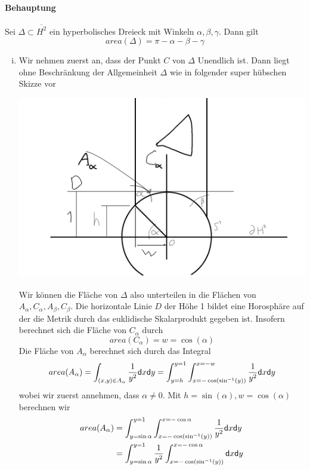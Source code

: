 \documentclass{book}
\renewcommand{\d}{\textsf{d}}
\begin{document}
\paragraph{Behauptung}
Sei $\Delta \subset \overline{H^2}$ ein hyperbolisches Dreieck mit Winkeln $\alpha, \beta, \gamma$. Dann gilt
\[ area(\Delta) = \pi - \alpha - \beta - \gamma \]
\begin{Beweis}{}
	\begin{enumerate}[(i)]
		\item Wir nehmen zuerst an, dass der Punkt $C$ von $\Delta$ Unendlich ist. Dann liegt ohne Beschränkung der Allgemeinheit $\Delta$ wie in folgender super hübschen Skizze vor
		\begin{center}
			\includegraphics[scale = 0.3]{Skizze1.png}	
		\end{center}
		Wir können die Fläche von $\Delta$ also unterteilen in die Flächen von $A_{\alpha}, C_{\alpha}, A_{\beta}, C_{\beta}$. Die horizontale Linie $D$ der Höhe 1 bildet eine Horosphäre auf der die Metrik durch das euklidische Skalarprodukt gegeben ist. Insofern berechnet sich die Fläche von $C_{\alpha}$ durch
		\[ area(C_{\alpha}) = w = \cos(\alpha) \]
		Die Fläche von $A_{\alpha}$ berechnet sich durch das Integral
		\[ area(A_\alpha) = \int_{(x,y) \in A_{\alpha}}\frac{1}{y^2} \d x \d y = \int_{y = h}^{y = 1} \int_{x = -\cos(\sin\i(y))}^{x = -w} \frac{1}{y^2} \d x \d y \]
		wobei wir zuerst annehmen, dass $\alpha \neq 0$. Mit $h = \sin(\alpha), w = \cos(\alpha)$ berechnen wir
		\begin{align*}
		area(A_\alpha)  &= \int_{y = \sin \alpha}^{y = 1} \int_{x = -\cos(\sin\i(y))}^{x = -\cos \alpha} \frac{1}{y^2} \d x \d y \\
		&= \int_{y = \sin \alpha}^{y = 1} \frac{1}{y^2}\int_{x = -\cos(\sin\i(y))}^{x = -\cos \alpha}  \d x \d y \\

\end{align*}
\end{enumerate}
\end{Beweis}
\end{document}
